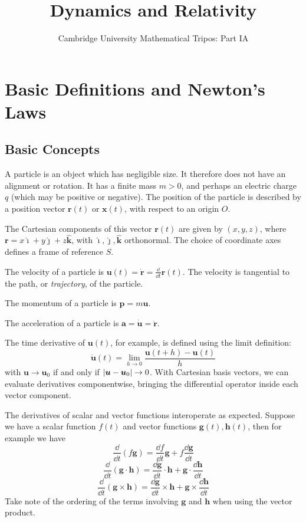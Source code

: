\documentclass{article}
\title{Dynamics and Relativity}
\author{Cambridge University Mathematical Tripos: Part IA}
\begin{document}
\maketitle

\tableofcontents
\newpage

\section{Basic Definitions and Newton's Laws}
\subsection{Basic Concepts}
\begin{definition}
    A particle is an object which has negligible size. It therefore does not have an alignment or rotation. It has a finite mass $m > 0$, and perhaps an electric charge $q$ (which may be positive or negative). The position of the particle is described by a position vector $\bm r(t)$ or $\bm x(t)$, with respect to an origin $O$.
\end{definition}
\begin{definition}
    The Cartesian components of this vector $\bm r(t)$ are given by $(x, y, z)$, where $\bm r = x \hat{\bm \imath} + y \hat{\bm \jmath} + z \hat{\bm k}$, with $\hat{\bm \imath}, \hat{\bm \jmath}, \hat{\bm k}$ orthonormal. The choice of coordinate axes defines a frame of reference $S$.
\end{definition}
\begin{definition}
    The velocity of a particle is $\bm u(t) = \dot{\bm r} = \frac{\dd}{\dd t}\bm r(t)$. The velocity is tangential to the path, or \textit{trajectory}, of the particle.
\end{definition}
\begin{definition}
    The momentum of a particle is $\bm p = m \bm u$.
\end{definition}
\begin{definition}
    The acceleration of a particle is $\bm a = \dot{\bm u} = \ddot{\bm r}$.
\end{definition}
\begin{note}
    The time derivative of $\bm u(t)$, for example, is defined using the limit definition:
    \[ \dot{\bm u}(t) = \lim_{h \to 0} \frac{\bm u(t + h) - \bm u(t)}{h} \]
    with $\bm u \to \bm u_0$ if and only if $\abs{\bm u - \bm u_0} \to 0$. With Cartesian basis vectors, we can evaluate derivatives componentwise, bringing the differential operator inside each vector component.
\end{note}
The derivatives of scalar and vector functions interoperate as expected. Suppose we have a scalar function $f(t)$ and vector functions $\bm g(t), \bm h(t)$, then for example we have
\[ \frac{\dd}{\dd t}(f \bm g) = \frac{\dd f}{\dd t} \bm g + f \frac{\dd \bm g}{\dd t} \]
\[ \frac{\dd}{\dd t}(\bm g \cdot \bm h) = \frac{\dd \bm g}{\dd t}\cdot \bm h + \bm g \cdot \frac{\dd \bm h}{\dd t} \]
\[ \frac{\dd}{\dd t}(\bm g \times \bm h) = \frac{\dd \bm g}{\dd t}\times \bm h + \bm g \times \frac{\dd \bm h}{\dd t} \]
Take note of the ordering of the terms involving $\bm g$ and $\bm h$ when using the vector product.
\end{document}
